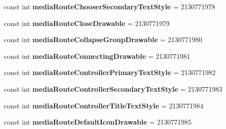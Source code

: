 \begin{DoxyCompactItemize}
\item 
\mbox{\label{class_sample_app_1_1_droid_1_1_resource_1_1_attribute_a5d2e115c3f6afbb7b0e79fef6da9da62}} 
const int {\bfseries media\+Route\+Chooser\+Secondary\+Text\+Style} = 2130771978
\item 
\mbox{\label{class_sample_app_1_1_droid_1_1_resource_1_1_attribute_aeb731ab03c935b8822f15a0b2c6728e3}} 
const int {\bfseries media\+Route\+Close\+Drawable} = 2130771979
\item 
\mbox{\label{class_sample_app_1_1_droid_1_1_resource_1_1_attribute_a41e0841d7e6293cc775faf2be4c4458f}} 
const int {\bfseries media\+Route\+Collapse\+Group\+Drawable} = 2130771980
\item 
\mbox{\label{class_sample_app_1_1_droid_1_1_resource_1_1_attribute_ab1739fb8368ec3bffe7d5c02f5b10b69}} 
const int {\bfseries media\+Route\+Connecting\+Drawable} = 2130771981
\item 
\mbox{\label{class_sample_app_1_1_droid_1_1_resource_1_1_attribute_accd65acc0e0e43e57d302967fb606c21}} 
const int {\bfseries media\+Route\+Controller\+Primary\+Text\+Style} = 2130771982
\item 
\mbox{\label{class_sample_app_1_1_droid_1_1_resource_1_1_attribute_aa5c1154617983e3e7e6bb3fe2ffd0775}} 
const int {\bfseries media\+Route\+Controller\+Secondary\+Text\+Style} = 2130771983
\item 
\mbox{\label{class_sample_app_1_1_droid_1_1_resource_1_1_attribute_ab36032392279527c3b7cff92218f9950}} 
const int {\bfseries media\+Route\+Controller\+Title\+Text\+Style} = 2130771984
\item 
\mbox{\label{class_sample_app_1_1_droid_1_1_resource_1_1_attribute_aa9f13b9403af113c06faad3777d085ed}} 
const int {\bfseries media\+Route\+Default\+Icon\+Drawable} = 2130771985

\end{DoxyCompactItemize}
